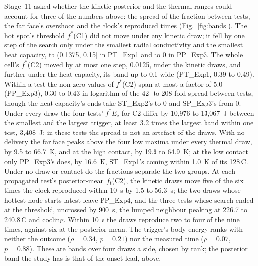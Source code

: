 \documentclass[preprint,12pt]{elsarticle}
\newcommand{\degC}{\,\textdegree C}
\newcommand{\fs}{f^{*}}
\newcommand{\ft}{f_{\mathrm{t}}}
\newcommand{\Ee}{E_{\mathrm{e}}}
\begin{document}
Stage~11 asked whether the kinetic posterior and the thermal ranges could account for three of the numbers above: the spread of the fraction between tests, the far face's overshoot and the clock's reproduced times (Fig.~\ref{fig:bands}). The hot spot's threshold $\fs$(C1) did not move under any kinetic draw; it fell by one step of the search only under the smallest radial conductivity and the smallest heat capacity, to (0.1375, 0.15] in PT\_Exp1 and to 0 in PP\_Exp3. The whole cell's $\fs$(C2) moved by at most one step, 0.0125, under the kinetic draws, and further under the heat capacity, its band up to 0.1 wide (PT\_Exp1, 0.39 to 0.49). Within a test the non-zero values of $\fs$(C2) span at most a factor of 5.0 (PP\_Exp3), 0.30 to 0.43 in logarithm of the 42- to 208-fold spread between tests, though the heat capacity's ends take ST\_Exp2's to 0 and SP\_Exp3's from 0. Under every draw the four tests' $\fs\Ee$ for C2 differ by 10,976 to 13,067~J between the smallest and the largest trigger, at least 3.2 times the largest band within one test, 3,408~J: in these tests the spread is not an artefact of the draws. With no delivery the far face peaks above the four low maxima under every thermal draw, by 9.5 to 66.7~K, and at the high contact, by 19.9 to 64.9~K; at the low contact only PP\_Exp3's does, by 16.6~K, ST\_Exp1's coming within 1.0~K of its 128\degC. Under no draw or contact do the fractions separate the two groups. At each propagated test's posterior-mean $\ft$(C2), the kinetic draws move five of the six times the clock reproduced within 10~s by 1.5 to 56.3~s; the two draws whose hottest node starts latest leave PP\_Exp4, and the three tests whose search ended at the threshold, uncrossed by 900~s, the lumped neighbour peaking at 226.7 to 240.8\degC{} and cooling. Within 10~s the draws reproduce two to four of the nine times, against six at the posterior mean. The trigger's body energy ranks with neither the outcome ($\rho=0.34$, $p=0.21$) nor the measured time ($\rho=0.07$, $p=0.88$). These are bands over four draws a side, chosen by rank; the posterior band the study has is that of the onset lead, above.
\end{document}
